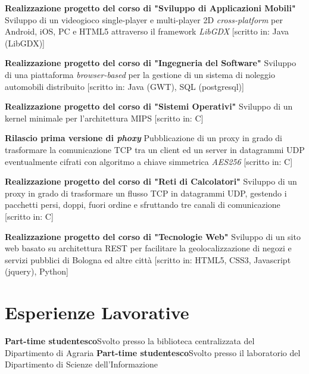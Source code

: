 \documentclass[11pt,a4paper]{moderncv}
\begin{document}
 {\textbf{Realizzazione progetto del corso di "Sviluppo di Applicazioni Mobili"} \cite{shuttle}\newline Sviluppo di un videogioco single-player e multi-player 2D {\em cross-platform} per Android, iOS, PC e HTML5 attraverso il framework {\em LibGDX} [scritto in: Java (LibGDX)]}

 {\textbf{Realizzazione progetto del corso di "Ingegneria del Software"} \cite{lis}\newline Sviluppo di una piattaforma {\em browser-based} per la gestione di un sistema di noleggio automobili distribuito [scritto in: Java (GWT), SQL (postgresql)]}

 {\textbf{Realizzazione progetto del corso di "Sistemi Operativi"} \cite{so}\newline Sviluppo di un kernel minimale per l'architettura MIPS [scritto in: C]}

 {\textbf{Rilascio prima versione di {\em phoxy}} \cite{phoxy}\newline Pubblicazione di un proxy in grado di trasformare la comunicazione TCP tra un client ed un server in datagrammi UDP eventualmente cifrati con algoritmo a chiave simmetrica {\em AES256} [scritto in: C]}

 {\textbf{Realizzazione progetto del corso di "Reti di Calcolatori"} \cite{reti}\newline Sviluppo di un proxy in grado di trasformare un flusso TCP in datagrammi UDP, gestendo i pacchetti persi, doppi, fuori ordine e sfruttando tre canali di comunicazione [scritto in: C]}

 {\textbf{Realizzazione progetto del corso di "Tecnologie Web"} \cite{progettotw} \cite{codicetw}\newline Sviluppo di un sito web basato su architettura REST per facilitare la geolocalizzazione di negozi e servizi pubblici di Bologna ed altre città [scritto in: HTML5, CSS3, Javascript (jquery), Python]}

\section{Esperienze Lavorative}
 {\textbf{Part-time studentesco}\newline Svolto presso la biblioteca centralizzata del Dipartimento di Agraria}
 {\textbf{Part-time studentesco}\newline Svolto presso il laboratorio del Dipartimento di Scienze dell'Informazione}
\end{document}
